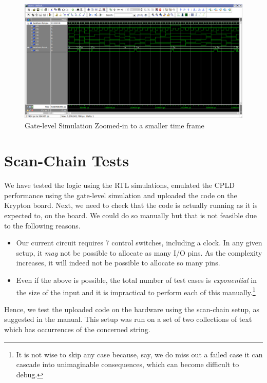 \documentclass[a4paper, 11pt]{article}
\begin{document}
\begin{figure}[H]
\centering
\includegraphics[scale=0.33]{Gate2}
\caption{Gate-level Simulation Zoomed-in to a smaller time frame}
\end{figure}

\section{Scan-Chain Tests}

We have tested the logic using the RTL simulations, emulated the CPLD performance using the gate-level simulation and uploaded the code on the Krypton board. Next, we need to check that the code is actually running as it is expected to, on the board. We could do so manually but that is not feasible due to the following reasons.
\begin{itemize}
	\item Our current circuit requires 7 control switches, including a clock. In any given setup, it \emph{may} not be possible to allocate as many I/O pins. As the complexity increases, it will indeed not be possible to allocate so many pins.
	\item Even if the above is possible, the total number of test cases is \emph{exponential} in the size of the input and it is impractical to perform each of this manually.\footnote{It is not wise to skip any case because, say, we do miss out a failed case it can cascade into unimaginable consequences, which can become difficult to debug.}
\end{itemize}

Hence, we test the uploaded code on the hardware using the scan-chain setup, as suggested in the manual. This setup was run on a set of two collections of text which has occurrences of the concerned string.
\end{document}
